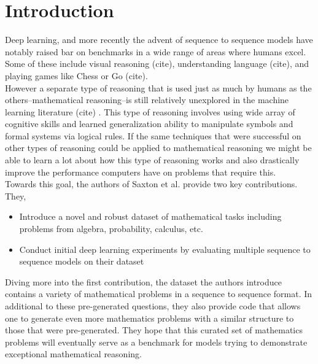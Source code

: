 










\section{Introduction}

Deep learning, and more recently the advent of sequence to sequence models have notably raised bar on benchmarks in a wide range of 
areas where humans excel. Some of these include visual reasoning (cite), understanding language (cite), and playing games like Chess or Go (cite). \\ 

However a separate type of reasoning that is used just as much by humans as the others--mathematical reasoning--is still relatively unexplored in the machine learning literature (cite) . This type of reasoning involves using  wide array of cognitive skills and learned generalization ability to manipulate symbols and formal systems via logical rules. If the same techniques that were successful on other types of reasoning could be applied to mathematical reasoning we might be able to learn a lot about how this type of reasoning works and also drastically improve the performance computers have on problems that require this. \\ 


Towards this goal, the authors of Saxton et al. \supercite{DBLP:journals/corr/abs-1904-01557}  provide two key contributions. They, 

\begin{itemize}
   \item Introduce a novel and robust dataset of mathematical tasks including problems from algebra, probability, calculus, etc.
   \item Conduct initial deep learning experiments by evaluating multiple sequence to sequence models on their dataset 
\end{itemize}

Diving more into the first contribution, the dataset the authors introduce contains a variety of mathematical problems in a sequence to sequence format. In additional to these pre-generated questions, they also provide code that allows one to generate even more mathematics problems with a similar structure to those that were pre-generated. They hope that this curated set of mathematics problems will eventually serve as a benchmark for models trying to demonstrate exceptional mathematical reasoning.  \\

